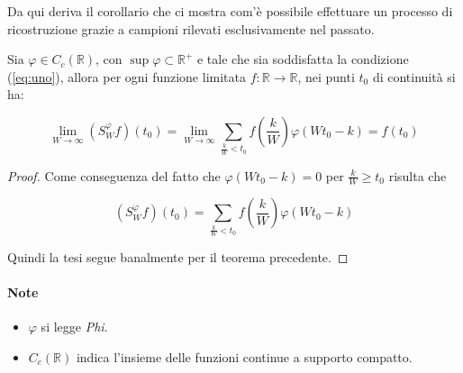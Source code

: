 Da qui deriva il corollario che ci mostra com'è possibile effettuare un processo
di ricostruzione grazie a campioni rilevati esclusivamente nel passato.

\begin{corollary}
    Sia $\varphi \in C_c(\mathbb{R})$, con $\sup \varphi \subset \mathbb{R}^+$ e
    tale che sia soddisfatta la condizione (\ref{eq:uno}), allora per ogni funzione limitata
    $f: \mathbb{R} \rightarrow \mathbb{R}$, nei punti $t_0$ di continuità si ha:

    $$
        \lim_{W \rightarrow \infty} (S_W^{\varphi}f)(t_0) = \lim_{W \rightarrow \infty} \sum_{\frac{k}{W} < t_0} f(\frac{k}{W}) \varphi(Wt_0 - k) = f(t_0)
    $$
\end{corollary}

\begin{proof}
    Come conseguenza del fatto che $\varphi(Wt_0-k) = 0$ per $\frac{k}{W} \ge t_0$ risulta che

    $$
        (S_W^{\varphi}f)(t_0) = \sum_{\frac{k}{W} < t_0} f(\frac{k}{W}) \varphi(Wt_0 - k)
    $$

    Quindi la tesi segue banalmente per il teorema precedente.
\end{proof}

\paragraph{Note}
\begin{itemize}
    \item $\varphi$ si legge \textit{Phi}.
    \item $C_c(\mathbb{R})$ indica l'insieme delle funzioni continue a supporto
          compatto.
\end{itemize}
